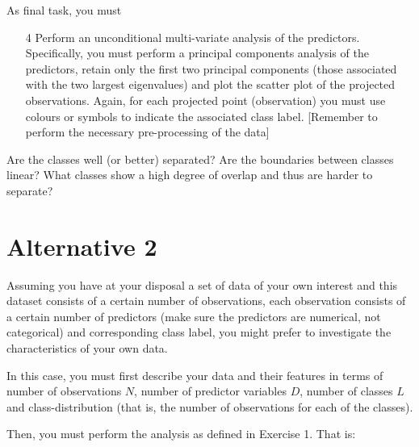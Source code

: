 \documentclass[a4paper,11pt]{article}
\begin{document}
\vskip0.25cm\noindent As final task, you must
\begin{enumerate}
\item[4] Perform an unconditional multi-variate analysis of the predictors. Specifically, you must perform a principal components analysis of the predictors, retain only the first two principal components (those associated with the two largest eigenvalues) and plot the scatter plot of the projected observations. Again, for each projected point (observation) you must use colours or symbols to indicate the associated class label. [Remember to perform the necessary pre-processing of the data]
\end{enumerate}
Are the classes well (or better) separated? Are the boundaries between classes linear? What classes show a high degree of overlap and thus are harder to separate?

\section*{Alternative 2}
Assuming you have at your disposal a set of data of your own interest and this dataset consists of a certain number of observations, each observation consists of a certain number of predictors (make sure the predictors are numerical, not categorical) and corresponding class label, you might prefer to investigate the characteristics of your own data.

\vskip0.25cm\noindent In this case, you must first describe your data and their features in terms of number of observations $N$, number of predictor variables $D$, number of classes $L$ and class-distribution (that is, the number of observations for each of the classes). 

\vskip0.25cm\noindent Then, you must perform the analysis as defined in Exercise 1. That is:
\end{document}
